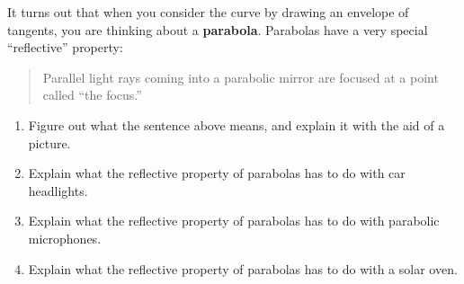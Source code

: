 \documentclass[noauthor,nooutcomes,hints,handout]{ximera}
\begin{document}
\begin{question}
  It turns out that when you consider the curve by drawing an envelope
  of tangents, you are thinking about a \textbf{parabola}. Parabolas
  have a very special ``reflective'' property:
  \begin{quote}
    Parallel light rays coming into a parabolic mirror are focused at
    a point called ``the focus.''
  \end{quote}
  \begin{enumerate}
  \item Figure out what the sentence above means, and explain it with
    the aid of a picture.
  \item Explain what the reflective property of parabolas has to do
    with car headlights.
  \item Explain what the reflective property of parabolas has to do
    with parabolic microphones.
  \item Explain what the reflective property of parabolas has to do
    with a solar oven.
  \end{enumerate}
\end{question}
\end{document}

